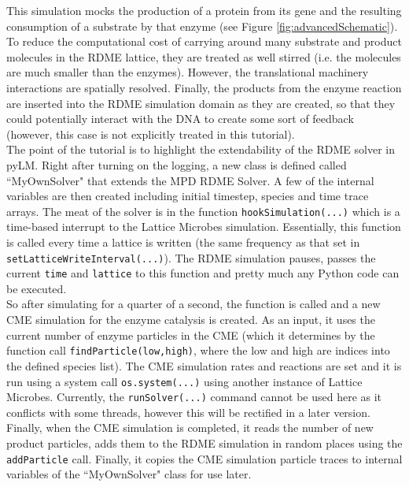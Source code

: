 This simulation mocks the production of a protein from its gene and the resulting consumption of a substrate by that enzyme (see Figure \ref{fig:advancedSchematic}).  To reduce the computational cost of carrying around many substrate and product molecules in the RDME lattice, they are treated as well stirred (i.e. the molecules are much smaller than the enzymes).  However, the translational machinery interactions are spatially resolved.  Finally, the products from the enzyme reaction are inserted into the RDME simulation domain as they are created, so that they could potentially interact with the DNA to create some sort of feedback (however, this case is not explicitly treated in this tutorial).  \\

The point of the tutorial is to highlight the extendability of the RDME solver in pyLM.  Right after turning on the logging, a new class is defined called ``MyOwnSolver" that extends the MPD RDME Solver.  A few of the internal variables are then created including initial timestep, species and time trace arrays.  The meat of the solver is in the function \texttt{hookSimulation(...)} which is a time-based interrupt to the Lattice Microbes simulation.  Essentially, this function is called every time a lattice is written (the same frequency as that set in \texttt{setLatticeWriteInterval(...)}).  The RDME simulation pauses, passes the current \texttt{time} and \texttt{lattice} to this function and pretty much any Python code can be executed.\\



So after simulating for a quarter of a second, the function is called and a new CME simulation for the enzyme catalysis is created.  As an input, it uses the current number of enzyme particles in the CME (which it determines by the function call \texttt{findParticle(low,high)}, where the low and high are indices into the defined species list).  The CME simulation rates and reactions are set and it is run using a system call \texttt{os.system(...)} using another instance of Lattice Microbes.  Currently, the \texttt{runSolver(...)} command cannot be used here as it conflicts with some threads, however this will be rectified in a later version.  Finally, when the CME simulation is completed, it reads the number of new product particles, adds them to the RDME simulation in random places using the \texttt{addParticle} call.  Finally, it copies the CME simulation particle traces to internal variables of the ``MyOwnSolver" class for use later.  \\

